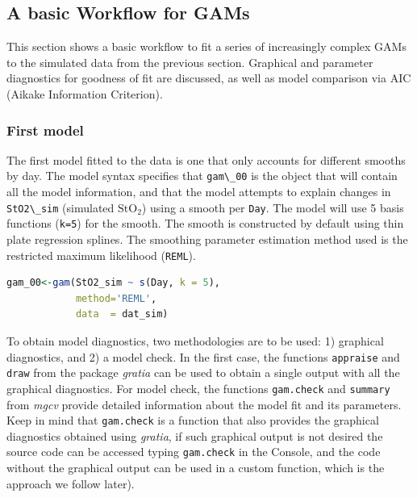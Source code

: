 \documentclass[
]{article}
\newcommand{\passthrough}[1]{#1}
\begin{document}
\hypertarget{workflow}{%
\subsection{A basic Workflow for GAMs}\label{workflow}}

This section shows a basic workflow to fit a series of increasingly complex GAMs to the simulated data from the previous section. Graphical and parameter diagnostics for goodness of fit are discussed, as well as model comparison via AIC (Aikake Information Criterion).

\hypertarget{first-model}{%
\subsubsection{First model}\label{first-model}}

The first model fitted to the data is one that only accounts for different smooths by day. The model syntax specifies that \passthrough{\lstinline!gam\_00!} is the object that will contain all the model information, and that the model attempts to explain changes in \passthrough{\lstinline!StO2\_sim!} (simulated \(\mbox{StO}_2\)) using a smooth per \passthrough{\lstinline!Day!}. The model will use 5 basis functions (\passthrough{\lstinline!k=5!}) for the smooth. The smooth is constructed by default using thin plate regression splines. The smoothing parameter estimation method used is the restricted maximum likelihood (\passthrough{\lstinline!REML!}).

\begin{lstlisting}[language=R]
gam_00<-gam(StO2_sim ~ s(Day, k = 5),
            method='REML',
            data  = dat_sim)
\end{lstlisting}

To obtain model diagnostics, two methodologies are to be used: 1) graphical diagnostics, and 2) a model check. In the first case, the functions \passthrough{\lstinline!appraise!} and \passthrough{\lstinline!draw!} from the package \emph{gratia} can be used to obtain a single output with all the graphical diagnostics. For model check, the functions \passthrough{\lstinline!gam.check!} and \passthrough{\lstinline!summary!} from \emph{mgcv} provide detailed information about the model fit and its parameters. Keep in mind that \passthrough{\lstinline!gam.check!} is a function that also provides the graphical diagnostics obtained using \emph{gratia}, if such graphical output is not desired the source code can be accessed typing \passthrough{\lstinline!gam.check!} in the Console, and the code without the graphical output can be used in a custom function, which is the approach we follow later).
\end{document}
